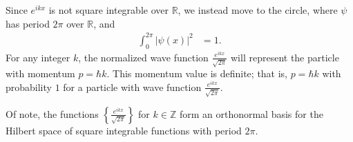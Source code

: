 \documentclass[12pt]{extarticle}
\newcommand{\Z}{\mathbb{Z}}
\newcommand{\R}{\mathbb{R}}
\newcommand{\set}[1]{\left\{#1\right\}}
\theoremstyle{plain}
\theoremstyle{definition}
\theoremstyle{remark}
\renewcommand{\newline}{\hfill\break}
\begin{document}
  Since $e^{ikx}$ is not square integrable over $\R$, we instead move to the circle, where $\psi$ has period $2\pi$ over $\R$, and
  \begin{align*}
    \int_{0}^{2\pi}\left\vert \psi(x) \right\vert^2 &= 1.
  \end{align*}
  For any integer $k$, the normalized wave function $\frac{e^{ikx}}{\sqrt{2\pi}}$ will represent the particle with momentum $p = \hbar k$. This momentum value is definite; that is, $p = \hbar k$ with probability $1$ for a particle with wave function $\frac{e^{ikx}}{\sqrt{2\pi}}$.\newline

  Of note, the functions $\set{\frac{e^{ikx}}{\sqrt{2\pi}}}$ for $k\in \Z$ form an orthonormal basis for the Hilbert space of square integrable functions with period $2\pi$.\newline
\end{document}
